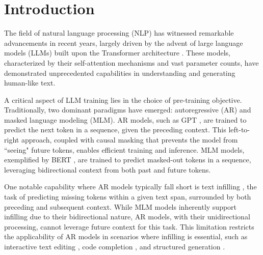 \section{Introduction}


The field of natural language processing (NLP) has witnessed remarkable advancements in recent years, largely driven by the advent of large language models (LLMs) \cite{zhao2023survey} built upon the Transformer architecture \cite{vaswani2017attention}. These models, characterized by their self-attention mechanisms and vast parameter counts, have demonstrated unprecedented capabilities in understanding and generating human-like text.

A critical aspect of LLM training lies in the choice of pre-training objective. Traditionally, two dominant paradigms have emerged: autoregressive (AR) and masked language modeling (MLM). AR models, such as GPT \cite{achiam2023gpt}, are trained to predict the next token in a sequence, given the preceding context. This left-to-right approach, coupled with causal masking that prevents the model from ``seeing" future tokens, enables efficient training and inference. MLM models, exemplified by BERT \cite{devlin2019bertpretrainingdeepbidirectional}, are trained to predict masked-out tokens in a sequence, leveraging bidirectional context from both past and future tokens.

One notable capability where AR models typically fall short is text infilling \cite{donahue2020enabling}, the task of predicting missing tokens within a given text span, surrounded by both preceding and subsequent context. While MLM models inherently support infilling due to their bidirectional nature, AR models, with their unidirectional processing, cannot leverage future context for this task.  This limitation restricts the applicability of AR models in scenarios where infilling is essential, such as interactive text editing \cite{lee2022coauthor}, code completion \cite{liu2020multi}, and structured generation \cite{xia2024fofo}. 


